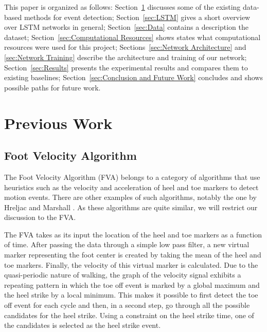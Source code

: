 \documentclass{acm_proc_article-sp}
\begin{document}

This paper is organized as follows:
Section~\ref{sec:Previous Work}
discusses some of the existing data-based methods for event detection;
Section~\ref{sec:LSTM}
gives a short overview over LSTM networks in general;
Section~\ref{sec:Data}
contains a description the dataset;
Section~\ref{sec:Computational Resources}
shows states what computational resources were used for this project;
Sections~\ref{sec:Network Architecture} and \ref{sec:Network Training}
describe the architecture and training of our network;
Section~\ref{sec:Results}
presents the experimental results and compares them to existing baselines;
Section~\ref{sec:Conclusion and Future Work}
concludes and shows possible paths for future work.

\section{Previous Work}
\label{sec:Previous Work}

\subsection{Foot Velocity Algorithm}
\label{sub:Foot Velocity Algorithm}

The Foot Velocity Algorithm (FVA)
\cite{OConnor2007}
belongs to a category of algorithms that use heuristics such as the velocity
and acceleration of heel and toe markers to detect motion events.
There are other examples of such algorithms, notably the one by Hreljac and 
Marshall
\cite{Hreljac2000}.
As these algorithms are quite similar, we will restrict our discussion
to the FVA.

The FVA takes as its input the location of the heel and toe markers as a
function of time.
After passing the data through a simple low pass filter,
a new virtual marker representing the foot center is created by taking the mean
of the heel and toe markers.
Finally, the velocity of this virtual marker is calculated.
Due to the quasi-periodic nature of walking, the graph of the velocity signal
exhibits a repeating pattern in which the toe off event is marked by a global
maximum and the heel strike by a local minimum.
This makes it possible to first detect the toe off event for each cycle and
then, in a second step, go through all the possible candidates for the heel
strike.
Using a constraint on the heel strike time, one of the candidates is selected
as the heel strike event.
\end{document}

